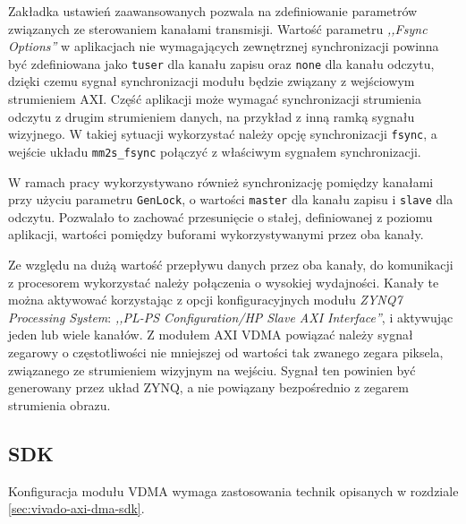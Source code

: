Zakładka ustawień zaawansowanych pozwala na zdefiniowanie parametrów związanych ze sterowaniem kanałami transmisji.
Wartość parametru \textit{,,Fsync Options''} w aplikacjach nie wymagających zewnętrznej synchronizacji powinna być zdefiniowana jako \texttt{tuser} dla kanału zapisu oraz \texttt{none} dla kanału odczytu, dzięki czemu sygnał synchronizacji modułu będzie związany z wejściowym strumieniem AXI. %
Część aplikacji może wymagać synchronizacji strumienia odczytu z drugim strumieniem danych, na przykład z inną ramką sygnału wizyjnego. 
W takiej sytuacji wykorzystać należy opcję synchronizacji \texttt{fsync}, a wejście układu \texttt{mm2s\_fsync} połączyć z właściwym sygnałem synchronizacji.

W ramach pracy wykorzystywano również synchronizację pomiędzy kanałami przy użyciu parametru \texttt{GenLock}, o wartości \texttt{master} dla kanału zapisu i \texttt{slave} dla odczytu. 
Pozwalało to zachować przesunięcie o stałej, definiowanej z poziomu aplikacji, wartości pomiędzy buforami wykorzystywanymi przez oba kanały.

Ze względu na dużą wartość przepływu danych przez oba kanały, do komunikacji z procesorem wykorzystać należy połączenia o wysokiej wydajności. Kanały te można aktywować korzystając z opcji konfiguracyjnych modułu \emph{ZYNQ7 Processing System}: \emph{,,PL-PS Configuration/HP Slave AXI Interface''}, i aktywując jeden lub wiele kanałów. %
Z modułem AXI VDMA powiązać należy sygnał zegarowy o częstotliwości nie mniejszej od wartości tak zwanego zegara piksela, związanego ze strumieniem wizyjnym na wejściu. %
Sygnał ten powinien być generowany przez układ ZYNQ, a nie powiązany bezpośrednio z zegarem strumienia obrazu.

\subsection{SDK}
Konfiguracja modułu VDMA wymaga zastosowania technik opisanych w rozdziale \ref{sec:vivado-axi-dma-sdk}. %

